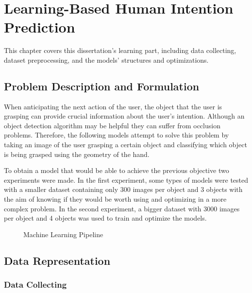 \chapter{Learning-Based Human Intention Prediction}
\label{chapter:learning}


This chapter covers this dissertation's learning part, including data collecting, dataset preprocessing, and the models' structures and optimizations.

\section{Problem Description and Formulation}

When anticipating the next action of the user, the object that the user is grasping can provide crucial information about the user's intention. Although an object detection algorithm may be helpful they can suffer from occlusion problems. Therefore, the following models attempt to solve this problem by taking an image of the user grasping a certain object and classifying which object is being grasped using the geometry of the hand.

To obtain a model that would be able to achieve the previous objective two experiments were made. In the first experiment, some types of models were tested with a smaller dataset containing only 300 images per object and 3 objects with the aim of knowing if they would be worth using and optimizing in a more complex problem. In the second experiment, a bigger dataset with 3000 images per object and 4 objects was used to train and optimize the models.

\begin{figure}[H]%
    \centering
    
    \caption{Machine Learning Pipeline}
    \label{fig:ml_pipeline}
\end{figure}

\section{Data Representation}

\subsection{Data Collecting}

